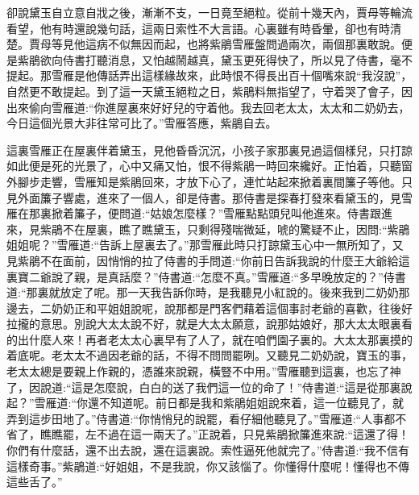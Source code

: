 

\begin{parag}
    卻說黛玉自立意自戕之後，漸漸不支，一日竟至絕粒。從前十幾天內，賈母等輪流看望，他有時還說幾句話，這兩日索性不大言語。心裏雖有時昏暈，卻也有時清楚。賈母等見他這病不似無因而起，也將紫鵑雪雁盤問過兩次，兩個那裏敢說。便是紫鵑欲向侍書打聽消息，又怕越鬧越真，黛玉更死得快了，所以見了侍書，毫不提起。那雪雁是他傳話弄出這樣緣故來，此時恨不得長出百十個嘴來說“我沒說”，自然更不敢提起。到了這一天黛玉絕粒之日，紫鵑料無指望了，守着哭了會子，因出來偷向雪雁道:“你進屋裏來好好兒的守着他。我去回老太太，太太和二奶奶去，今日這個光景大非往常可比了。”雪雁答應，紫鵑自去。
\end{parag}


\begin{parag}
    這裏雪雁正在屋裏伴着黛玉，見他昏昏沉沉，小孩子家那裏見過這個樣兒，只打諒如此便是死的光景了，心中又痛又怕，恨不得紫鵑一時回來纔好。正怕着，只聽窗外腳步走響，雪雁知是紫鵑回來，才放下心了，連忙站起來掀着裏間簾子等他。只見外面簾子響處，進來了一個人，卻是侍書。那侍書是探春打發來看黛玉的，見雪雁在那裏掀着簾子，便問道:“姑娘怎麼樣？”雪雁點點頭兒叫他進來。侍書跟進來，見紫鵑不在屋裏，瞧了瞧黛玉，只剩得殘喘微延，唬的驚疑不止，因問:“紫鵑姐姐呢？”雪雁道:“告訴上屋裏去了。”那雪雁此時只打諒黛玉心中一無所知了，又見紫鵑不在面前，因悄悄的拉了侍書的手問道:“你前日告訴我說的什麼王大爺給這裏寶二爺說了親，是真話麼？”侍書道:“怎麼不真。”雪雁道:“多早晚放定的？”侍書道:“那裏就放定了呢。那一天我告訴你時，是我聽見小紅說的。後來我到二奶奶那邊去，二奶奶正和平姐姐說呢，說那都是門客們藉着這個事討老爺的喜歡，往後好拉攏的意思。別說大太太說不好，就是大太太願意，說那姑娘好，那大太太眼裏看的出什麼人來！再者老太太心裏早有了人了，就在咱們園子裏的。大太太那裏摸的着底呢。老太太不過因老爺的話，不得不問問罷咧。又聽見二奶奶說，寶玉的事，老太太總是要親上作親的，憑誰來說親，橫豎不中用。”雪雁聽到這裏，也忘了神了，因說道:“這是怎麼說，白白的送了我們這一位的命了！”侍書道:“這是從那裏說起？”雪雁道:“你還不知道呢。前日都是我和紫鵑姐姐說來着，這一位聽見了，就弄到這步田地了。”侍書道:“你悄悄兒的說罷，看仔細他聽見了。”雪雁道:“人事都不省了，瞧瞧罷，左不過在這一兩天了。”正說着，只見紫鵑掀簾進來說:“這還了得！你們有什麼話，還不出去說，還在這裏說。索性逼死他就完了。”侍書道:“我不信有這樣奇事。”紫鵑道:“好姐姐，不是我說，你又該惱了。你懂得什麼呢！懂得也不傳這些舌了。”
\end{parag}


